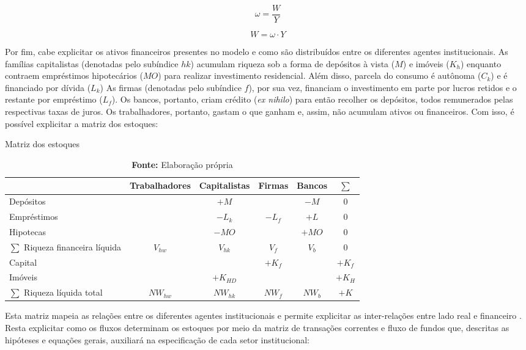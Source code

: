 
$$
\omega = \frac{W}{Y}
$$

\begin{equation}
\label{_W}
    W = \omega\cdot Y
\end{equation}

Por fim, cabe explicitar os ativos financeiros presentes no modelo e como são distribuídos entre os diferentes agentes institucionais. As famílias capitalistas (denotadas pelo subíndice $hk$) acumulam riqueza sob a forma de depósitos à vista ($M$) e imóveis ($K_h$) enquanto contraem empréstimos hipotecários ($MO$) para realizar investimento residencial.
Além disso, parcela do consumo é autônoma ($C_k$) e é financiado por dívida ($L_k$)
As firmas (denotadas pelo subíndice $f$), por sua vez, financiam o investimento em parte por lucros retidos e o restante por empréstimo ($L_f$). Os bancos, portanto, criam crédito (\textit{ex nihilo}) para então recolher os depósitos, todos remunerados pelas respectivas taxas de juros. 
Os trabalhadores, portanto, gastam o que ganham e, assim, não acumulam ativos ou financeiros.
Com isso, é possível explicitar a matriz dos estoques:


\begin{table}[H]
\centering
\caption{Matriz dos estoques}
\begin{tabular}{lccccc}
\hline
\hline


                          & Trabalhadores & Capitalistas      & Firmas        & Bancos  &    $\sum$ \\ \hline

Depósitos & & $+M$ & & $-M$ & 0\\
Empréstimos& &$-L_k$ &$-L_f$& $+L$ & 0\\
Hipotecas & &$-MO$&  & $+MO$ & 0\\\hline
$\sum$ Riqueza financeira líquida &$V_{hw}$ &$V_{hk}$&$V_f$&$V_b$& $0$\\\hline
Capital & & &$+K_f$&  & $+K_f$\\
Imóveis & &$+K_{HD}$& &   & $+K_{H}$\\\hline
$\sum$ Riqueza líquida total &$NW_{hw}$&$NW_{hk}$&$NW_f$&$NW_b$& $+K$\\
\hline
\hline
\end{tabular}%
\caption*{\textbf{Fonte:} Elaboração própria}
\end{table}

Esta matriz mapeia as relações entre os diferentes agentes institucionais e permite explicitar as inter-relações entre lado real e financeiro \cite{dos_santos_revisiting_2010}. Resta explicitar como os fluxos determinam os estoques por meio da matriz de transações correntes e fluxo de fundos que, descritas as hipóteses e equações gerais, auxiliará na especificação de cada setor institucional:

